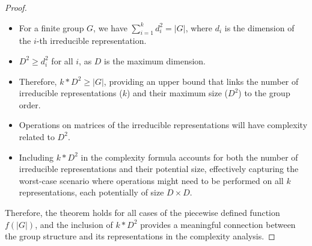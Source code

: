 \documentclass[11pt,a4paper]{article}
\begin{document}
\begin{proof}
\begin{itemize}
\item For a finite group $G$, we have $\sum_{i=1}^k d_i^2 = |G|$, where $d_i$ is the dimension of the $i$-th irreducible representation.
\item $D^2 \geq d_i^2$ for all $i$, as $D$ is the maximum dimension.
\item Therefore, $k * D^2 \geq |G|$, providing an upper bound that links the number of irreducible representations ($k$) and their maximum size ($D^2$) to the group order.
\item Operations on matrices of the irreducible representations will have complexity related to $D^2$.
\item Including $k * D^2$ in the complexity formula accounts for both the number of irreducible representations and their potential size, effectively capturing the worst-case scenario where operations might need to be performed on all $k$ representations, each potentially of size $D \times D$.
\end{itemize}
Therefore, the theorem holds for all cases of the piecewise defined function $f(|G|)$, and the inclusion of $k * D^2$ provides a meaningful connection between the group structure and its representations in the complexity analysis.
\end{proof}
\end{document}

